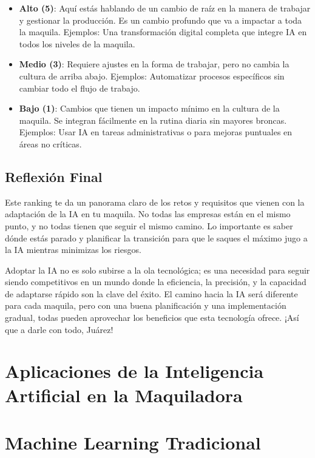 \documentclass[
  10pt,
  letterpaper,
]{book}
\providecommand{\tightlist}{%
  \setlength{\itemsep}{0pt}\setlength{\parskip}{0pt}}\usepackage{longtable,booktabs,array}
\begin{document}
\begin{enumerate}
  \begin{itemize}
  \tightlist
  \item
    \textbf{Alto (5)}: Aquí estás hablando de un cambio de raíz en la
    manera de trabajar y gestionar la producción. Es un cambio profundo
    que va a impactar a toda la maquila. Ejemplos: Una transformación
    digital completa que integre IA en todos los niveles de la maquila.
  \item
    \textbf{Medio (3)}: Requiere ajustes en la forma de trabajar, pero
    no cambia la cultura de arriba abajo. Ejemplos: Automatizar procesos
    específicos sin cambiar todo el flujo de trabajo.
  \item
    \textbf{Bajo (1)}: Cambios que tienen un impacto mínimo en la
    cultura de la maquila. Se integran fácilmente en la rutina diaria
    sin mayores broncas. Ejemplos: Usar IA en tareas administrativas o
    para mejoras puntuales en áreas no críticas.
  \end{itemize}
\end{enumerate}

\subsection{Reflexión Final}\label{reflexiuxf3n-final-1}

Este ranking te da un panorama claro de los retos y requisitos que
vienen con la adaptación de la IA en tu maquila. No todas las empresas
están en el mismo punto, y no todas tienen que seguir el mismo camino.
Lo importante es saber dónde estás parado y planificar la transición
para que le saques el máximo jugo a la IA mientras minimizas los
riesgos.

Adoptar la IA no es solo subirse a la ola tecnológica; es una necesidad
para seguir siendo competitivos en un mundo donde la eficiencia, la
precisión, y la capacidad de adaptarse rápido son la clave del éxito. El
camino hacia la IA será diferente para cada maquila, pero con una buena
planificación y una implementación gradual, todas pueden aprovechar los
beneficios que esta tecnología ofrece. ¡Así que a darle con todo,
Juárez!

\section{Aplicaciones de la Inteligencia Artificial en la
Maquiladora}\label{aplicaciones-de-la-inteligencia-artificial-en-la-maquiladora-1}

\section{Machine Learning
Tradicional}\label{machine-learning-tradicional}
\end{document}
